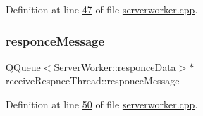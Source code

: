 Definition at line \hyperlink{a00107_source_l00047}{47} of file \hyperlink{a00107_source}{serverworker.\+cpp}.

\mbox{\label{a00221_a7f0a11ce86c12c80ca4305eaac48a285}} 
\subsubsection{\texorpdfstring{responce\+Message}{responceMessage}}
{\footnotesize\ttfamily Q\+Queue$<$\hyperlink{a00189}{Server\+Worker\+::responce\+Data}$>$$\ast$ receive\+Respnce\+Thread\+::responce\+Message}



Definition at line \hyperlink{a00107_source_l00050}{50} of file \hyperlink{a00107_source}{serverworker.\+cpp}.

